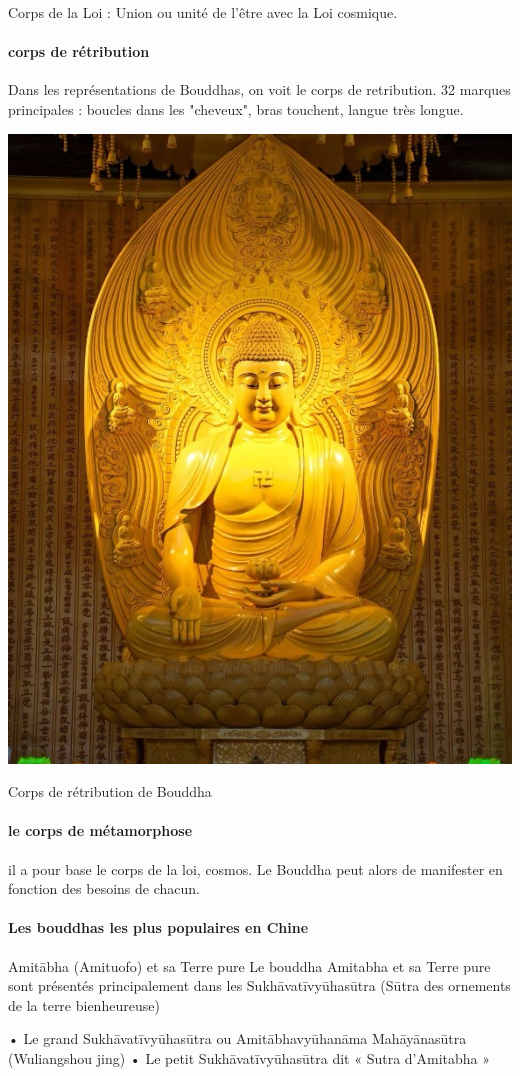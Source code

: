Corps de la Loi : Union ou unité de l'être avec la Loi cosmique.


\paragraph{corps de rétribution} Dans les représentations de Bouddhas, on voit le corps de retribution. 32 marques principales : boucles dans les "cheveux", bras touchent, langue très longue.


\begin{marginfigure}
    \centering
    \includegraphics[width=\textwidth]{ConfucianismeTaoismeBouddhismeChinois/Images/bouddha.jpg}
    \caption{Corps de rétribution de Bouddha}
    \label{fig:enter-label}
\end{marginfigure}

\paragraph{le corps de métamorphose} il a pour base le corps de la loi, cosmos. Le Bouddha peut alors de manifester en fonction des besoins de chacun. 

\paragraph{Les bouddhas les plus populaires en Chine}




Amitābha (Amituofo) et sa Terre pure
Le bouddha Amitabha et sa Terre pure sont présentés principalement dans les Sukhāvatīvyūhasūtra (Sūtra des ornements de la terre bienheureuse)

•	Le grand Sukhāvatīvyūhasūtra ou Amitābhavyūhanāma Mahāyānasūtra (Wuliangshou jing)
•	Le petit Sukhāvatīvyūhasūtra dit « Sutra d’Amitabha »
